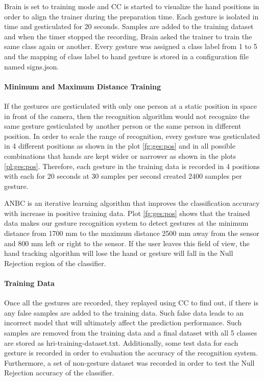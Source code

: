 

Brain is set to training mode and CC is started to visualize the hand positions in order to align the trainer during the preparation time. Each gesture is isolated in time and gesticulated for 20 seconds. Samples are added to the training dataset and when the timer stopped the recording, Brain asked the trainer to train the same class again or another. Every gesture was assigned a class label from 1 to 5 and the mapping of class label to hand gesture is stored in a configuration file named signs.json. 



\paragraph*{Minimum and Maximum Distance Training} \label{sec:range:train} If the gestures are gesticulated with only one person at a static position in space in front of the camera, then the recognition algorithm would not recognize the same gesture gesticulated by another person or the same person in different position. In order to scale the range of recognition, every gesture was gesticulated in 4 different positions as shown in the plot \ref{fg:ges:pos} and in all possible combinations that hands are kept wider or narrower as shown in the plots \ref{pl:ges:pos}. Therefore, each gesture in the training data is recorded in 4 positions with each for 20 seconds at 30 samples per second created 2400 samples per gesture. 

ANBC is an iterative learning algorithm that improves the classification accuracy with increase in positive training data. Plot \ref{fg:ges:pos} shows that the trained data makes our gesture recognition system to detect gestures at the minimum distance from 1700 mm to the maximum distance 2500 mm away from the sensor and 800 mm left or right to the sensor. If the user leaves this field of view, the hand tracking algorithm will lose the hand or gesture will fall in the Null Rejection region of the classifier.



\paragraph*{Training Data} Once all the gestures are recorded, they replayed using CC to find out, if there is any false samples are added to the training data. Such false data leads to an incorrect model that will ultimately affect the prediction performance. Such samples are removed from the training data and a final dataset with all 5 classes are stored as hri-training-dataset.txt. Additionally, some test data for each gesture is recorded in order to evaluation the accuracy of the recognition system. Furthermore, a set of non-gesture dataset was recorded in order to test the Null Rejection accuracy of the classifier. 

